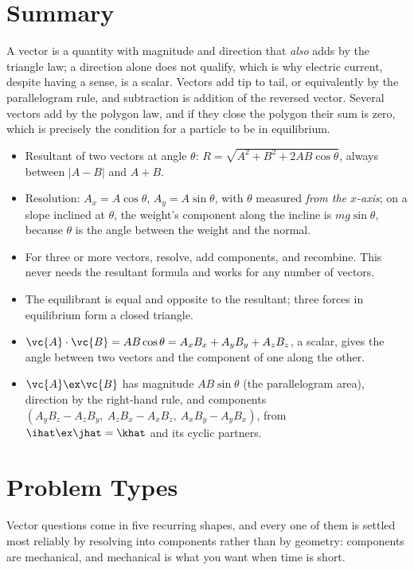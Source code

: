 \section{Summary}\label{sec:summary3}
A vector is a quantity with magnitude and direction that \emph{also} adds by the triangle law; a
direction alone does not qualify, which is why electric current, despite having a sense, is a scalar.
Vectors add tip to tail, or equivalently by the parallelogram rule, and subtraction is addition of the
reversed vector. Several vectors add by the polygon law, and if they close the polygon their sum is zero,
which is precisely the condition for a particle to be in equilibrium.

\begin{itemize}
\item Resultant of two vectors at angle $\theta$: $R=\sqrt{A^2+B^2+2AB\cos\theta}$, always between
      $|A-B|$ and $A+B$.
\item Resolution: $A_x=A\cos\theta$, $A_y=A\sin\theta$, with $\theta$ measured \emph{from the $x$-axis};
      on a slope inclined at $\theta$, the weight's component along the incline is $mg\sin\theta$, because
      $\theta$ is the angle between the weight and the normal.
\item For three or more vectors, resolve, add components, and recombine. This never needs the resultant
      formula and works for any number of vectors.
\item The equilibrant is equal and opposite to the resultant; three forces in equilibrium form a closed
      triangle.
\item $\vc{A}\cdot\vc{B}=AB\cos\theta=A_xB_x+A_yB_y+A_zB_z$, a scalar, gives the angle between two
      vectors and the component of one along the other.
\item $\vc{A}\ex\vc{B}$ has magnitude $AB\sin\theta$ (the parallelogram area), direction by the
      right-hand rule, and components $(A_yB_z-A_zB_y,\ A_zB_x-A_xB_z,\ A_xB_y-A_yB_x)$, from
      $\ihat\ex\jhat=\khat$ and its cyclic partners.
\end{itemize}

\section{Problem Types}\label{sec:types3}
Vector questions come in five recurring shapes, and every one of them is settled most reliably by
resolving into components rather than by geometry: components are mechanical, and mechanical is what
you want when time is short.

